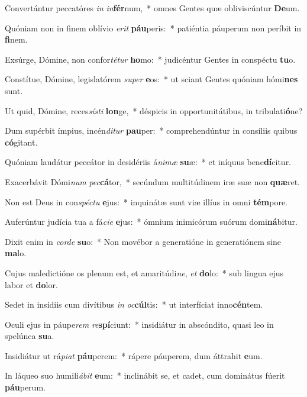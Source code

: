 \item Convertántur peccatóres \textit{in} \textit{in}\textbf{fér}num,~* omnes Gentes quæ obliviscúntur \textbf{De}um.
\item Quóniam non in finem oblívio \textit{e}\textit{rit} \textbf{páu}peris:~* patiéntia páuperum non períbit in \textbf{fi}nem.
\item Exsúrge, Dómine, non confor\textit{té}\textit{tur} \textbf{ho}mo:~* judicéntur Gentes in conspéctu \textbf{tu}o.
\item Constítue, Dómine, legislatórem \textit{su}\textit{per} \textbf{e}os:~* ut sciant Gentes quóniam hómi\textbf{nes} sunt.
\item Ut quid, Dómine, reces\textit{sís}\textit{ti} \textbf{lon}ge,~* déspicis in opportunitátibus, in tribulati\textbf{ó}ne?
\item Dum supérbit ímpius, incén\textit{di}\textit{tur} \textbf{pau}per:~* comprehendúntur in consíliis quibus \textbf{có}gitant.
\item Quóniam laudátur peccátor in desidériis á\textit{ni}\textit{mæ} \textbf{su}æ:~* et iníquus bene\textbf{dí}citur.
\item Exacerbávit Dómi\textit{num} \textit{pec}\textbf{cá}tor,~* secúndum multitúdinem iræ suæ non \textbf{quæ}ret.
\item Non est Deus in con\textit{spéc}\textit{tu} \textbf{e}jus:~* inquinátæ sunt viæ illíus in omni \textbf{tém}pore.
\item Auferúntur judícia tua a fá\textit{ci}\textit{e} \textbf{e}jus:~* ómnium inimicórum suórum domi\textbf{ná}bitur.
\item Dixit enim in \textit{cor}\textit{de} \textbf{su}o:~* Non movébor a generatióne in generatiónem sine \textbf{ma}lo.
\item Cujus maledictióne os plenum est, et amaritúdi\textit{ne}, \textit{et} \textbf{do}lo:~* sub lingua ejus labor et \textbf{do}lor.
\item Sedet in insídiis cum divítibus \textit{in} \textit{oc}\textbf{cúl}tis:~* ut interfíciat inno\textbf{cén}tem.
\item Oculi ejus in páupe\textit{rem} \textit{re}\textbf{spí}ciunt:~* insidiátur in abscóndito, quasi leo in spelúnca \textbf{su}a.
\item Insidiátur ut rá\textit{pi}\textit{at} \textbf{páu}perem:~* rápere páuperem, dum áttrahit \textbf{e}um.
\item In láqueo suo humili\textit{á}\textit{bit} \textbf{e}um:~* inclinábit se, et cadet, cum dominátus fúerit \textbf{páu}perum.
